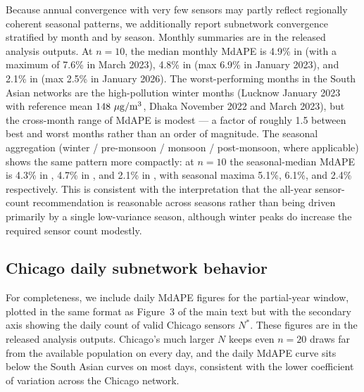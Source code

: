 Because annual convergence with very few sensors may partly reflect regionally coherent seasonal patterns, we additionally report subnetwork convergence stratified by month and by season. Monthly summaries are in the released analysis outputs. At $n=10$, the median monthly MdAPE is 4.9\% in  (with a maximum of 7.6\% in March 2023), 4.8\% in  (max 6.9\% in January 2023), and 2.1\% in  (max 2.5\% in January 2026). The worst-performing months in the South Asian networks are the high-pollution winter months (Lucknow January 2023 with reference mean $148~\mu\textrm{g}/\textrm{m}\textsuperscript{3}$, Dhaka November 2022 and March 2023), but the cross-month range of MdAPE is modest --- a factor of roughly 1.5 between best and worst months rather than an order of magnitude. The seasonal aggregation (winter / pre-monsoon / monsoon / post-monsoon, where applicable) shows the same pattern more compactly: at $n=10$ the seasonal-median MdAPE is 4.3\% in , 4.7\% in , and 2.1\% in , with seasonal maxima 5.1\%, 6.1\%, and 2.4\% respectively. This is consistent with the interpretation that the all-year sensor-count recommendation is reasonable across seasons rather than being driven primarily by a single low-variance season, although winter peaks do increase the required sensor count modestly.

\subsection{Chicago daily subnetwork behavior}\label{sec:si_chicago_daily}

For completeness, we include daily MdAPE figures for the  partial-year window, plotted in the same format as Figure~3 of the main text but with the secondary axis showing the daily count of valid Chicago sensors $N^*$. These figures are in the released analysis outputs. Chicago's much larger $N$ keeps even $n=20$ draws far from the available population on every day, and the daily MdAPE curve sits below the South Asian curves on most days, consistent with the lower coefficient of variation across the Chicago network.
